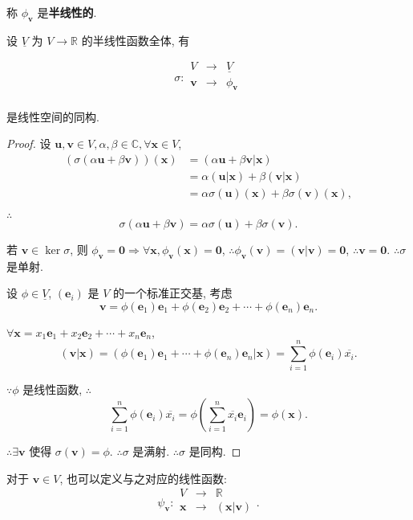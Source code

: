 \documentclass{ctexart}
\begin{document}
称 $\phi_{\boldsymbol{v}}$ 是\textbf{半线性的}.

设 $\underline{V}$ 为 $V\to\mathbb{R}$ 的半线性函数全体, 有
\begin{theorem}\label{t2.2}
    \[\sigma:\begin{array}{rcl}
        V & \to & \underline{V} \\
        \boldsymbol{v} & \to & \phi_{\boldsymbol{v}} \\
    \end{array}\]

    是线性空间的同构.
\end{theorem}
\begin{proof}
    设 $\boldsymbol{u},\boldsymbol{v}\in V,\alpha,\beta\in\mathbb{C},\forall\boldsymbol{x}\in V$,
    \begin{align*}
        (\sigma(\alpha\boldsymbol{u}+\beta\boldsymbol{v}))(\boldsymbol{x}) & =(\alpha\boldsymbol{u}+\beta\boldsymbol{v}|\boldsymbol{x}) \\
        & =\alpha(\boldsymbol{u}|\boldsymbol{x})+\beta(\boldsymbol{v}|\boldsymbol{x}) \\
        & =\alpha\sigma(\boldsymbol{u})(\boldsymbol{x})+\beta\sigma(\boldsymbol{v})(\boldsymbol{x}),
    \end{align*}

    $\therefore$
    \[\sigma(\alpha\boldsymbol{u}+\beta\boldsymbol{v})=\alpha\sigma(\boldsymbol{u})+\beta\sigma(\boldsymbol{v}).\]

    若 $\boldsymbol{v}\in\ker\sigma$, 则 $\phi_{\boldsymbol{v}}=\boldsymbol{0}\Rightarrow\forall\boldsymbol{x},\phi_{\boldsymbol{v}}(\boldsymbol{x})=\boldsymbol{0}$, $\therefore\phi_{\boldsymbol{v}}(\boldsymbol{v})=(\boldsymbol{v}|\boldsymbol{v})=\boldsymbol{0}$, $\therefore\boldsymbol{v}=\boldsymbol{0}$. $\therefore\sigma$ 是单射.

    设 $\phi\in\underline{V}$, $(\boldsymbol{e}_i)$ 是 $V$ 的一个标准正交基, 考虑
    \[\boldsymbol{v}=\phi(\boldsymbol{e}_1)\boldsymbol{e}_1+\phi(\boldsymbol{e}_2)\boldsymbol{e}_2+\cdots+\phi(\boldsymbol{e}_n)\boldsymbol{e}_n.\]

    $\forall\boldsymbol{x}=x_1\boldsymbol{e}_1+x_2\boldsymbol{e}_2+\cdots+x_n\boldsymbol{e}_n$,
    \[(\boldsymbol{v}|\boldsymbol{x})=(\phi(\boldsymbol{e}_1)\boldsymbol{e}_1+\cdots+\phi(\boldsymbol{e}_n)\boldsymbol{e}_n|\boldsymbol{x})=\sum\limits_{i=1}^n\phi(\boldsymbol{e}_i)\overline{x_i}.\]

    $\because\phi$ 是线性函数, $\therefore$
    \[\sum\limits_{i=1}^n\phi(\boldsymbol{e}_i)\overline{x_i}=\phi\left(\sum\limits_{i=1}^n\overline{x_i}\boldsymbol{e}_i\right)=\phi(\boldsymbol{x}).\]

    $\therefore\exists\boldsymbol{v}$ 使得 $\sigma(\boldsymbol{v})=\phi$. $\therefore\sigma$ 是满射. $\therefore\sigma$ 是同构.
\end{proof}
对于 $\boldsymbol{v}\in V$, 也可以定义与之对应的线性函数:
\[\psi_{\boldsymbol{v}}:\begin{array}{rcl}
    V & \to & \mathbb{R} \\
    \boldsymbol{x} & \to & (\boldsymbol{x}|\boldsymbol{v}) \\
\end{array}.\]
\end{document}
